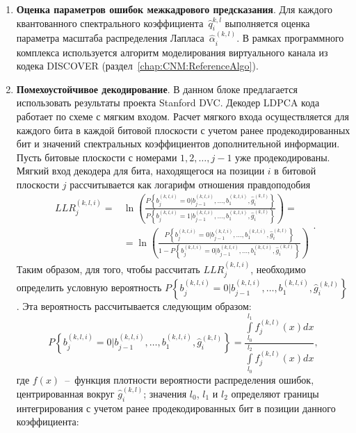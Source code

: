 \begin{enumerate}
  \item \textbf{Оценка параметров ошибок межкадрового предсказания}. Для каждого квантованного спектрального коэффициента~$\hat{q}^{k,l}_i$ выполняется оценка параметра масштаба распределения Лапласа~$\hat{\alpha}_i^{(k,l)}$. В рамках  программного комплекса используется алгоритм моделирования виртуального канала из кодека DISCOVER (раздел~\ref{chap:CNM:ReferenceAlgo}).
%  
 

  \item \textbf{Помехоустойчивое декодирование}. В данном блоке предлагается использовать результаты проекта Stanford DVC. Декодер LDPCA кода работает по схеме с мягким входом. Расчет мягкого входа осуществляется для каждого бита в каждой битовой плоскости с учетом ранее продекодированных бит и значений спектральных коэффициентов дополнительной информации. Пусть битовые плоскости с номерами $1,2,\ldots,j-1$ уже продекодированы. Мягкий вход декодера для бита, находящегося на позиции $i$ в битовой плоскости $j$ рассчитывается как логарифм отношения правдоподобия
  \begin{equation*}
  \begin{split}
  LLR_j^{(k,l,i)} = 
  & \ln \left( \frac{ P\left\{b_j^{(k,l,i)}=0 \vert b_{j-1}^{(k,l,i)},\ldots,b_{1}^{(k,l,i)},\hat{g}_i^{(k,l)} \right\} } { P\left\{b_j^{(k,l,i)}=1 \vert b_{j-1}^{(k,l,i)},\ldots,b_{1}^{(k,l,i)},\hat{g}_i^{(k,l)}\right\} } \right) = \\
  & = \ln\left( \frac{ P\left\{b_j^{(k,l,i)}=0 \vert b_{j-1}^{(k,l,i)},\ldots,b_{1}^{(k,l,i)},\hat{g}_i^{(k,l)} \right\} } { 1 - P\left\{b_j^{(k,l,i)}=0 \vert b_{j-1}^{(k,l,i)},\ldots,b_{1}^{(k,l,i)},\hat{g}_i^{(k,l)}\right\} } \right)
  \end{split}.
  \end{equation*}
  Таким образом, для того, чтобы рассчитать $LLR_j^{(k,l,i)}$, необходимо определить условную вероятность $P\left\{b_j^{(k,l,i)}=0 \vert b_{j-1}^{(k,l,i)},\ldots,b_{1}^{(k,l,i)},\hat{g}_i^{(k,l)} \right\}$. Эта вероятность рассчитывается следующим образом:
  \begin{equation*}
  P\left\{b_j^{(k,l,i)}=0 \vert b_{j-1}^{(k,l,i)},\ldots,b_{1}^{(k,l,i)},\hat{g}_i^{(k,l)} \right\} = \frac{\int\limits_{l_0}^{l_1} f_j^{(k,l)}(x) dx}{\int\limits_{l_0}^{l_2} f_j^{(k,l)}(x)dx},
  \end{equation*}  
  где $f(x)$~--~функция плотности вероятности распределения ошибок, центрированная вокруг $\hat{g}_i^{(k,l)}$; значения $l_0$, $l_1$ и $l_2$ определяют границы интегрирования с учетом ранее продекодированных бит в позиции данного коэффициента:

\end{enumerate}
